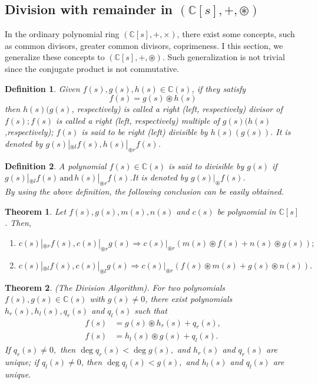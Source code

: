 \documentclass[12pt,a4paper,fleqn,twoside]{article}
\newtheorem{definition}{Definition}
\theoremstyle{plain}
\newtheorem{theorem}{Theorem}
\begin{document}
	\subsection{Division with remainder in $(\mathbb{C}[s],+,\circledast)$}
	In the ordinary polynomial ring $(\mathbb{C}[s],+,\times)$, there exist some concepts, such as common divisors, greater common divisors, coprimeness. I this section, we generalize these concepts to $(\mathbb{C}[s],+,\circledast)$. Such generalization is not trivial since the conjugate product is not commutative.
	\begin{definition}\normalfont
		Given $f(s),g(s),h(s) \in \mathbb{C}(s)$, if they satisfy
		\[f(s)=g(s)\circledast h(s)\]
		then $h(s) (g(s)$, respectively) is called a right (left, respectively) divisor of $f(s);f(s)$ is called a right (left, respectively) multiple of $g(s) (h(s)$,respectively); $f(s)$ is said to be right (left) divisible by $h(s) (g(s))$. It is denoted by $g(s)|_{\circledast l}f(s),h(s)|_{\circledast r}f(s)$.
	\end{definition}
	\begin{definition}\normalfont
		A polynomial $f(s) \in \mathbb{C}(s)$ is said to divisible by $g(s)$ if $g(s)|_{\circledast l}f(s)\, \text{and}\, h(s)|_{\circledast r}f(s)$.It is denoted by $g(s)|_\circledast f(s)$.\\
		\indent By using the above definition, the following conclusion can be easily obtained.
	\end{definition}
	\begin{theorem}\label{theorem 2}
		Let $f(s),g(s),m(s),n(s)$ and $c(s)$ be polynomial in $\mathbb{C}[s]$. Then,
		\begin{enumerate}[\normalfont(1)]
			\item $c(s)|_{\circledast r}f(s),c(s)|_{\circledast r}g(s) \Longrightarrow c(s)|_{\circledast r}(m(s)\circledast f(s)+n(s)\circledast g(s)); $
			\item $c(s)|_{\circledast l}f(s),c(s)|_{\circledast l}g(s) \Longrightarrow c(s)|_{\circledast r}(f(s)\circledast m(s)+g(s)\circledast n(s)). $
		\end{enumerate}
	\end{theorem}
	\begin{theorem}\label{theorem 3}
		(The Division Algorithm). For two polynomials $f(s),g(s)\in \mathbb{C}(s)$ with $g(s)\neq 0$, there exist polynomials $h_r(s), h_l(s),q_r(s)$ and $q_l(s)$ such that
		\begin{align}
			f(s)&=g(s)\circledast h_r(s)+q_r(s),\label{nyc1}\\
			f(s)&=h_l(s)\circledast g(s)+q_l(s).
		\end{align}
		If $q_r(s)\neq 0,$ then $\deg q_r(s) < \deg g(s),$ and $h_r(s)$ and $q_r(s)$ are unique; if $q_l(s)\neq 0$, then $\deg q_l(s)<g(s),$ and $h_l(s)$ and $q_l(s)$ are unique.
	\end{theorem}
\end{document}
